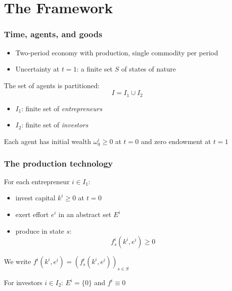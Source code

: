 \documentclass[blue]{beamer}
\def\geq{\geqslant}
\theoremstyle{definition}
\theoremstyle{example}
\begin{document}
\section{The Framework}

\begin{frame}\frametitle{Time, agents, and goods}
\begin{itemize}
\item Two-period economy with production, single commodity per period
\item Uncertainty at $t=1$: a finite set $S$ of states of nature
\end{itemize}
\bigskip

The set of agents is partitioned:
\begin{equation*}
I = I_1 \cup I_2
\end{equation*}

\begin{itemize}
\item $I_1$: finite set of \emph{entrepreneurs}
\item $I_2$: finite set of \emph{investors}
\end{itemize}
\bigskip

Each agent has initial wealth $\omega^i_0 \geq 0$ at $t=0$ and zero endowment at $t=1$
\end{frame}

\begin{frame}\frametitle{The production technology}
For each entrepreneur $i \in I_1$:
\begin{itemize}
\item invest capital $k^i \geq 0$ at $t=0$
\item exert effort $e^i$ in an abstract set $E^i$
\item produce in state $s$:
\begin{equation*}
f^i_s(k^i, e^i) \geq 0
\end{equation*}
\end{itemize}
\bigskip

We write $f^i(k^i, e^i) = (f^i_s(k^i, e^i))_{s \in S}$
\bigskip

For investors $i \in I_2$: $E^i = \{0\}$ and $f^i \equiv 0$
\end{frame}
\end{document}
